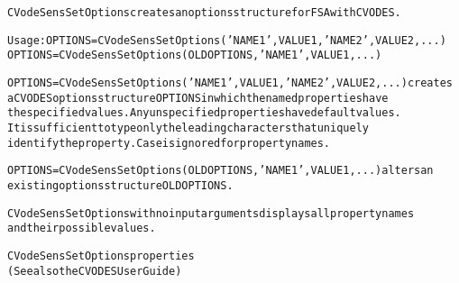 \begin{alltt}
CVodeSensSetOptions creates an options structure for FSA with CVODES.

   Usage: OPTIONS = CVodeSensSetOptions('NAME1',VALUE1,'NAME2',VALUE2,...)
          OPTIONS = CVodeSensSetOptions(OLDOPTIONS,'NAME1',VALUE1,...)

   OPTIONS = CVodeSensSetOptions('NAME1',VALUE1,'NAME2',VALUE2,...) creates 
   a CVODES options structure OPTIONS in which the named properties have 
   the specified values. Any unspecified properties have default values. 
   It is sufficient to type only the leading characters that uniquely 
   identify the property. Case is ignored for property names. 
   
   OPTIONS = CVodeSensSetOptions(OLDOPTIONS,'NAME1',VALUE1,...) alters an 
   existing options structure OLDOPTIONS.
   
   CVodeSensSetOptions with no input arguments displays all property names 
   and their possible values.
   
CVodeSensSetOptions properties
(See also the CVODES User Guide)


\end{alltt}
